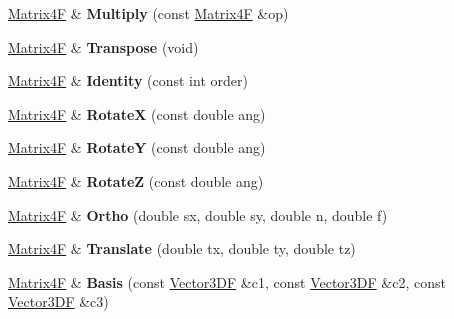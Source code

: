\begin{DoxyCompactItemize}
\item 
\hypertarget{class_matrix4_f_a49f934f11e08c433fcb7259ab295926d}{\hyperlink{class_matrix4_f}{Matrix4\+F} \& {\bfseries Multiply} (const \hyperlink{class_matrix4_f}{Matrix4\+F} \&op)}\label{class_matrix4_f_a49f934f11e08c433fcb7259ab295926d}

\item 
\hypertarget{class_matrix4_f_aac1b3d9286c0931068f0d6a1a3220690}{\hyperlink{class_matrix4_f}{Matrix4\+F} \& {\bfseries Transpose} (void)}\label{class_matrix4_f_aac1b3d9286c0931068f0d6a1a3220690}

\item 
\hypertarget{class_matrix4_f_a91eb1508d3b9629c599e615a01a91673}{\hyperlink{class_matrix4_f}{Matrix4\+F} \& {\bfseries Identity} (const int order)}\label{class_matrix4_f_a91eb1508d3b9629c599e615a01a91673}

\item 
\hypertarget{class_matrix4_f_a425b4e42172b89dec671e506427f34ac}{\hyperlink{class_matrix4_f}{Matrix4\+F} \& {\bfseries Rotate\+X} (const double ang)}\label{class_matrix4_f_a425b4e42172b89dec671e506427f34ac}

\item 
\hypertarget{class_matrix4_f_a748f1c8559cac96a781495e3402f8b87}{\hyperlink{class_matrix4_f}{Matrix4\+F} \& {\bfseries Rotate\+Y} (const double ang)}\label{class_matrix4_f_a748f1c8559cac96a781495e3402f8b87}

\item 
\hypertarget{class_matrix4_f_aada65940c0461247f6fd010fef31dbc8}{\hyperlink{class_matrix4_f}{Matrix4\+F} \& {\bfseries Rotate\+Z} (const double ang)}\label{class_matrix4_f_aada65940c0461247f6fd010fef31dbc8}

\item 
\hypertarget{class_matrix4_f_a76b301e4f9568dae2b183f2420ac9ab5}{\hyperlink{class_matrix4_f}{Matrix4\+F} \& {\bfseries Ortho} (double sx, double sy, double n, double f)}\label{class_matrix4_f_a76b301e4f9568dae2b183f2420ac9ab5}

\item 
\hypertarget{class_matrix4_f_a03fcead81b675e9bf448bc85810d1e40}{\hyperlink{class_matrix4_f}{Matrix4\+F} \& {\bfseries Translate} (double tx, double ty, double tz)}\label{class_matrix4_f_a03fcead81b675e9bf448bc85810d1e40}

\item 
\hypertarget{class_matrix4_f_af70e608fd1b8a5603e1380cc2368db8a}{\hyperlink{class_matrix4_f}{Matrix4\+F} \& {\bfseries Basis} (const \hyperlink{class_vector3_d_f}{Vector3\+D\+F} \&c1, const \hyperlink{class_vector3_d_f}{Vector3\+D\+F} \&c2, const \hyperlink{class_vector3_d_f}{Vector3\+D\+F} \&c3)}\label{class_matrix4_f_af70e608fd1b8a5603e1380cc2368db8a}


\end{DoxyCompactItemize}
